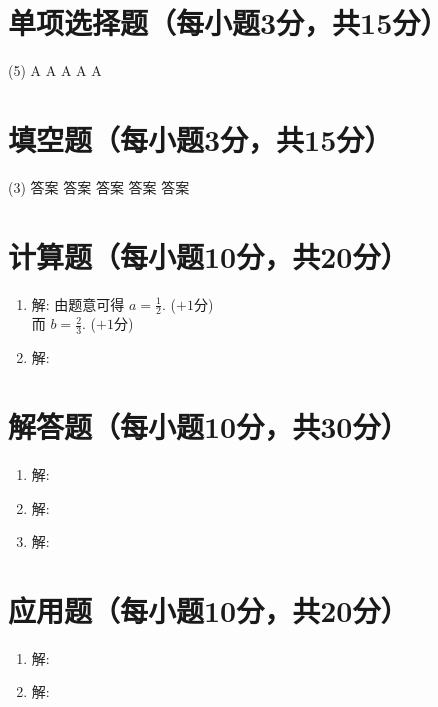\documentclass[answer,AutoFakeBold=2.85]{cjluexam}
\begin{document}
\maketitle

\section{单项选择题（每小题3分，共15分）}

\begin{tasks}(5)
  \task A
  \task A
  \task A
  \task A
  \task A
\end{tasks}

\section{填空题（每小题3分，共15分）}

\begin{tasks}(3)
  \task 答案
  \task 答案
  \task 答案
  \task 答案
  \task 答案
\end{tasks}

\section{计算题（每小题10分，共20分）}

\begin{enumerate}
  \item 解:
    由题意可得 $\displaystyle a=\frac12$.
    \dotfill ($+1$分)\\
    而 $\displaystyle b=\frac23$.
    \dotfill ($+1$分)
  \item 解:
\end{enumerate}

\section{解答题（每小题10分，共30分）}

\begin{enumerate}
  \item 解:
  \item 解:
  \item 解:
\end{enumerate}

\section{应用题（每小题10分，共20分）}

\begin{enumerate}
  \item 解:
  \item 解:
\end{enumerate}
\end{document}

